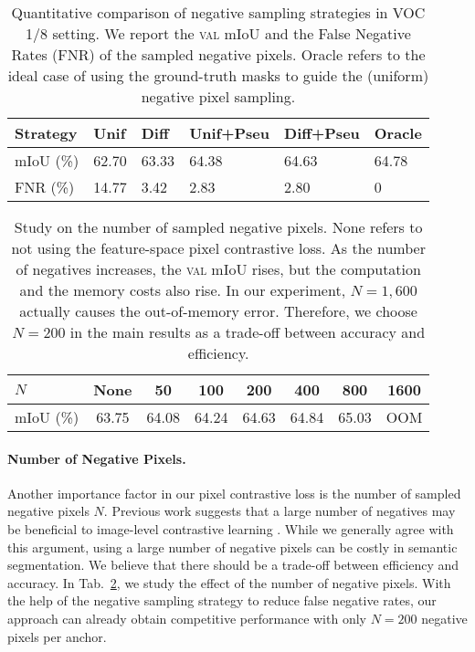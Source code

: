 \begin{table}[tb]
    \small
    \centering
    \caption{Quantitative comparison of negative sampling strategies in VOC 1/8 setting. We report the \textsc{val} mIoU and the False Negative Rates (FNR) of the sampled negative pixels. Oracle refers to the ideal case of using the ground-truth masks to guide the (uniform) negative pixel sampling.}
    \label{tab:abl/sample}
    \vspace{-5pt}
    \setlength{\tabcolsep}{5pt}
    \begin{tabular}{l|llll|l}
    \toprule
        Strategy  & Unif & Diff & Unif+Pseu & Diff+Pseu & Oracle  \\
    \midrule
        mIoU (\%)  & 62.70  & 63.33  & 64.38  & 64.63  & 64.78  \\
        FNR (\%)   & 14.77  & \phantom{0}3.42  & \phantom{0}2.83   & \phantom{0}2.80   & \phantom{0}0 \\
    \bottomrule
    \end{tabular}
    \vspace{-5pt}
\end{table}

\begin{table}[tb]
    \small
    \centering
    \caption{Study on the number of sampled negative pixels. None refers to not using the feature-space pixel contrastive loss. As the number of negatives increases, the \textsc{val} mIoU rises, but the computation and the memory costs also rise. In our experiment, $N=1,600$ actually causes the out-of-memory error. Therefore, we choose $N=200$ in the main results as a trade-off between accuracy and efficiency.}
    \label{tab:abl/numneg}
    \vspace{-5pt}
    \setlength{\tabcolsep}{3.5pt}
    \begin{tabular}{lccccccc}
    \toprule
        $N$ & None  & 50  & 100  & 200  & 400  & 800 & 1600 \\
    \midrule
    mIoU (\%)      & 63.75  & 64.08  & 64.24  & 64.63  & 64.84  &  65.03 & OOM \\
    \bottomrule
    \end{tabular}
    \vspace{-10pt}
\end{table}


\paragraph{Number of Negative Pixels.}
Another importance factor in our pixel contrastive loss is the number of sampled negative pixels $N$. Previous work suggests that a large number of negatives may be beneficial to image-level contrastive learning \cite{chen2020simple,he2020momentum}. While we generally agree with this argument, using a large number of negative pixels can be costly in semantic segmentation. We believe that there should be a trade-off between efficiency and accuracy. In Tab.~\ref{tab:abl/numneg}, we study the effect of the number of negative pixels. With the help of the negative sampling strategy to reduce false negative rates, our approach can already obtain competitive performance with only $N=200$ negative pixels per anchor.


